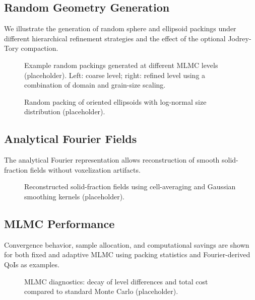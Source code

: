 \documentclass[preprint,12pt]{elsarticle}
\begin{document}
\subsection{Random Geometry Generation}
We illustrate the generation of random sphere and ellipsoid packings under different hierarchical refinement strategies and the effect of the optional Jodrey-Tory compaction.

\begin{figure}[htbp]
  \centering
  \caption{Example random packings generated at different MLMC levels (placeholder). Left: coarse level; right: refined level using a combination of domain and grain-size scaling.}
  \label{fig:packings}
\end{figure}

\begin{figure}[htbp]
  \centering
  \caption{Random packing of oriented ellipsoids with log-normal size distribution (placeholder).}
  \label{fig:ellipsoids}
\end{figure}

\subsection{Analytical Fourier Fields}
The analytical Fourier representation allows reconstruction of smooth solid-fraction fields without voxelization artifacts.

\begin{figure}[htbp]
  \centering
  \caption{Reconstructed solid-fraction fields using cell-averaging and Gaussian smoothing kernels (placeholder).}
  \label{fig:fourier_fields}
\end{figure}

\subsection{MLMC Performance}
Convergence behavior, sample allocation, and computational savings are shown for both fixed and adaptive MLMC using packing statistics and Fourier-derived QoIs as examples.

\begin{figure}[htbp]
  \centering
  \caption{MLMC diagnostics: decay of level differences and total cost compared to standard Monte Carlo (placeholder).}
  \label{fig:mlmc}
\end{figure}
\end{document}
